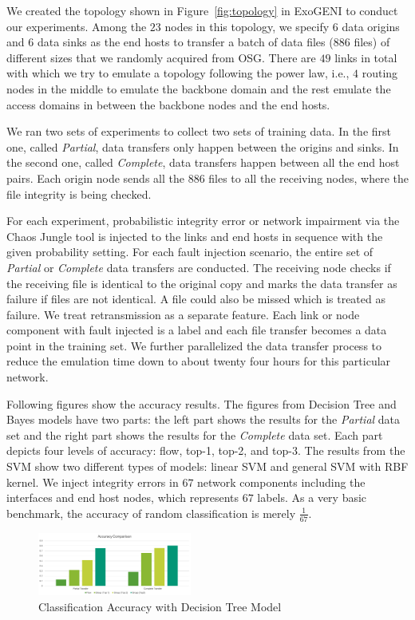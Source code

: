 We created the topology shown in Figure~\ref{fig:topology} in ExoGENI to conduct our experiments. Among the $23$ nodes in this topology, we specify $6$ data origins and $6$ data sinks as the end hosts to transfer a batch of data files ($886$ files) of different sizes that we randomly acquired from OSG. There are $49$ links in total with which we try to emulate a topology following the power law, i.e., $4$ routing nodes in the middle to emulate the backbone domain and the rest emulate the access domains in between the backbone nodes and the end hosts. 

We ran two sets of experiments to collect two sets of training data. In the first one, called {\it Partial},
data transfers only happen between the origins and sinks. In the second one, called {\it Complete}, 
data transfers happen between all the end host pairs. Each origin node sends all the $886$ files to all the receiving nodes, where the file integrity is being checked.

For each experiment, probabilistic integrity error or network impairment via the Chaos Jungle tool is injected to the links and end hosts in sequence with the given probability setting. For each fault injection scenario, the entire set of {\it Partial} or {\it Complete} data transfers are conducted. The receiving node checks if the receiving file is identical to the original copy and marks the data transfer as failure if files are not identical. A file could also be missed which is treated as failure. We treat retransmission as a separate feature. Each link or node component with fault injected is a label and each file transfer becomes a data point in the training set. We further parallelized the data transfer process to reduce the emulation time down to about twenty four hours for this particular network. 

Following figures show the accuracy results. The figures from Decision Tree and Bayes models have two parts: the left part shows the results for the {\it Partial} data set and the right part shows the results for the {\it Complete} data set. Each part depicts four levels of accuracy: flow, top-1, top-2, and top-3. The results from the SVM show two different types of models: linear SVM and general SVM with RBF kernel.
We inject integrity errors in $67$ network components including the interfaces and end host nodes, which represents $67$ labels. As a very basic benchmark, the accuracy of random classification is merely $\frac{1}{67}$.
\begin{figure}[!ht]
\begin{center}
\includegraphics[width=0.45\textwidth]{./figure/dt-result}
\end{center}
\vspace{-0.05in}
\caption{Classification Accuracy with Decision Tree Model}
\vspace{-0.05in}
\label{fig:dt}
\end{figure}

